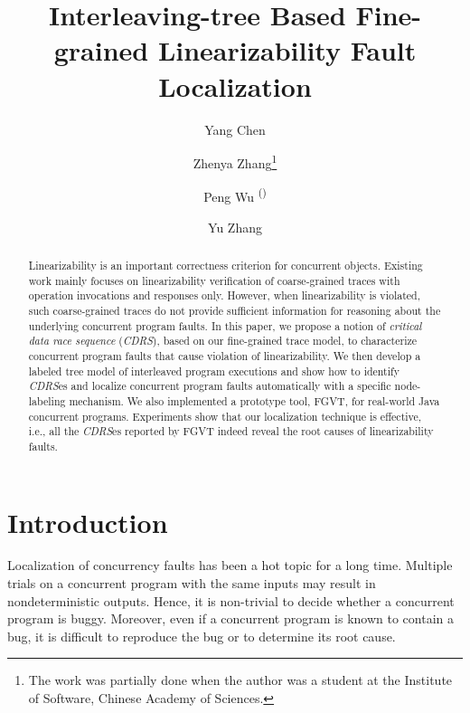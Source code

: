 \documentclass[runningheads]{llncs}
\begin{document}
%
\title{Interleaving-tree Based Fine-grained Linearizability Fault Localization}
%
%
\author{Yang Chen \and
Zhenya Zhang\thanks{The work was partially done when the author was a student at the Institute of Software, Chinese Academy of Sciences.} \and
Peng Wu \textsuperscript{(\Letter)} \and
Yu Zhang}
%
%
%
\maketitle              %
%
\begin{abstract}
Linearizability is an important correctness criterion for concurrent objects. Existing work mainly focuses on linearizability verification of coarse-grained traces with operation invocations and responses only. However, when linearizability is violated, such coarse-grained traces do not provide sufficient information for reasoning about the underlying concurrent program faults. In this paper, we propose a notion of \textit{critical data race sequence} (\textit{CDRS}), based on our fine-grained trace model, to characterize concurrent program faults that cause violation of linearizability. We then develop a labeled tree model of interleaved program executions and show how to identify \textit{CDRS}es and localize concurrent program faults automatically with a specific node-labeling mechanism. We also implemented a prototype tool, FGVT, for real-world Java concurrent programs. Experiments show that our localization technique is effective, i.e., all the \textit{CDRS}es reported by FGVT indeed reveal the root causes of linearizability faults.

\end{abstract}
%
%
%
%
%
\section{Introduction}\label{sec:introduction}
Localization of concurrency faults has been a hot topic for a long time. 
Multiple trials on a concurrent program with the same inputs may result in nondeterministic outputs. Hence, it is non-trivial to decide whether a concurrent program is buggy. Moreover, even if a concurrent program is known to contain a bug, it is difficult to reproduce the bug or to determine its root cause.
\end{document}
